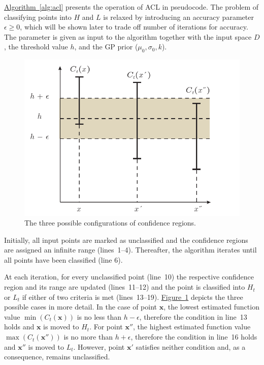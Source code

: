 \documentclass{article}
\def\*#1{\bm{#1}}
\newcommand{\figref}[1]{\hyperref[#1]{\mbox{Figure~\ref*{#1}}}}
\newcommand{\algoref}[1]{\hyperref[#1]{\mbox{Algorithm~\ref*{#1}}}}
\newcommand{\acl}{\textsf{ACL}\xspace}
\begin{document}
\algoref{alg:acl} presents the operation of \acl in pseudocode. The problem
of classifying points into $H$ and $L$ is relaxed by introducing an
accuracy parameter $\epsilon \geq 0$, which will be shown later to trade off
number of iterations for accuracy. The parameter is given as
input to the algorithm together with the input space $D$, the threshold value
$h$, and the GP prior ($\mu_0, \sigma_0, k$).

\begin{figure}[tb]
\begin{center}
\centerline{\includegraphics[width=\columnwidth]{figures/class}}
\caption{The three possible configurations of confidence regions.}
\label{fig:class}
\end{center}
\end{figure} 

Initially, all input points are marked as unclassified and the
confidence regions are assigned an infinite range (lines~1--4). Thereafter,
the algorithm iterates until all points have been classified (line 6).

At each iteration, for every unclassified point
(line~10) the respective confidence region and its range are updated
(lines~11--12) and the point is classified into $H_t$ or $L_t$ if either
of two criteria is met (lines~13--19). \figref{fig:class} depicts the
three possible cases in more detail. In the case of point $\*x$,
the lowest estimated function value $\min(C_t(\*x))$ is no less
than $h-\epsilon$, therefore the condition in line~13 holds and $\*x$
is moved to $H_t$. For point $\*x''$, the highest estimated
function value $\max(C_t(\*x''))$ is no more than $h+\epsilon$,
therefore the condition in line~16 holds and $\*x''$ is moved to $L_t$.
However, point $\*x'$ satisfies neither condition and, as a consequence,
remains unclassified.
\end{document}
